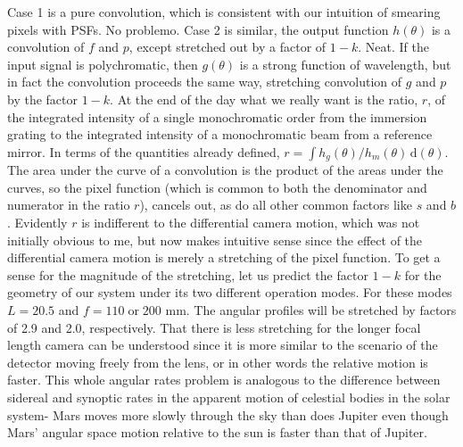 Case 1 is a pure convolution, which is consistent with our intuition of smearing pixels with PSFs.  No problemo.  Case 2 is similar, the output function $h(\theta)$ is a convolution of $f$ and $p$, except stretched out by a factor of $1-k$.  Neat.  If the input signal is polychromatic, then $g(\theta)$ is a strong function of wavelength, but in fact the convolution proceeds the same way, stretching convolution of $g$ and $p$ by the factor $1-k$.  At the end of the day what we really want is the ratio, $r$, of the integrated intensity of a single monochromatic order from the immersion grating to the integrated intensity of a monochromatic beam from a reference mirror.  In terms of the quantities already defined, $r= \int h_{g}(\theta)/h_{m}(\theta)\,\mathrm{d}(\theta)$.  The area under the curve of a convolution is the product of the areas under the curves, so the pixel function (which is common to both the denominator and numerator in the ratio $r$), cancels out, as do all other common factors like $s$ and $b$.  Evidently $r$ is indifferent to the differential camera motion, which was not initially obvious to me, but now makes intuitive sense since the effect of the differential camera motion is merely a stretching of the pixel function.  To get a sense for the magnitude of the stretching, let us predict the factor $1-k$ for the geometry of our system under its two different operation modes.  For these modes $L=20.5$ and $f=110 \mathrm{\;or\;} 200$ mm.  The angular profiles will be stretched by factors of 2.9 and 2.0, respectively.  That there is less stretching for the longer focal length camera can be understood since it is more similar to the scenario of the detector moving freely from the lens, or in other words the relative motion is faster.  This whole angular rates problem is analogous to the difference between sidereal and synoptic rates in the apparent motion of celestial bodies in the solar system- Mars moves more slowly through the sky than does Jupiter even though Mars' angular space motion relative to the sun is faster than that of Jupiter.  

